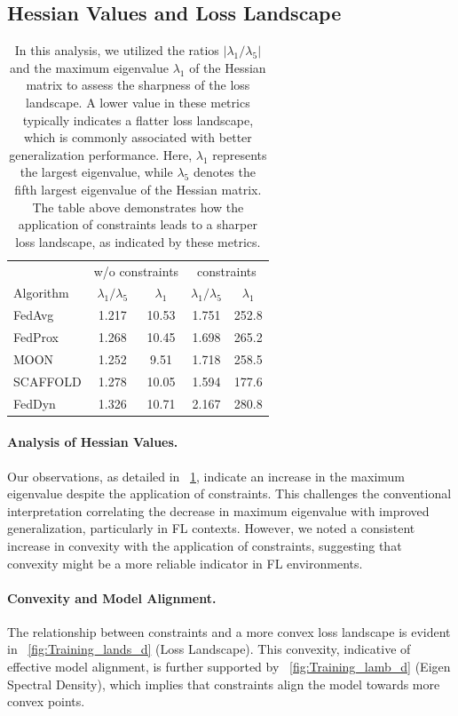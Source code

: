 \documentclass{article}
\theoremstyle{plain}
\theoremstyle{definition}
\theoremstyle{remark}
\begin{document}
\subsection{Hessian Values and Loss Landscape}


\begin{table}[!ht]
\centering
\begin{tabular}{l|cc|cc}
\hline
& \multicolumn{2}{c|}{w/o constraints} & \multicolumn{2}{c}{constraints} \\
Algorithm & $\lambda_{1}/ \lambda_{5}$ & $\lambda_{1}$ & $\lambda_{1}/ \lambda_{5}$ & $\lambda_{1}$ \\
\hline
FedAvg & 1.217 & 10.53 & 1.751 & 252.8 \\
FedProx & 1.268 & 10.45 & 1.698 & 265.2 \\
MOON & 1.252 & 9.51 & 1.718 & 258.5 \\
SCAFFOLD & 1.278 & 10.05 & 1.594 & 177.6 \\
FedDyn & 1.326 & 10.71 & 2.167 & 280.8 \\
\hline
\end{tabular}
\caption{In this analysis, we utilized the ratios $|\lambda_{1} / \lambda_{5}|$ and the maximum eigenvalue $\lambda_{1}$ of the Hessian matrix to assess the sharpness of the loss landscape. A lower value in these metrics typically indicates a flatter loss landscape, which is commonly associated with better generalization performance. Here, $\lambda_{1}$ represents the largest eigenvalue, while $\lambda_{5}$ denotes the fifth largest eigenvalue of the Hessian matrix. The table above demonstrates how the application of constraints leads to a sharper loss landscape, as indicated by these metrics.}
\label{tab:hes}
\end{table}

\paragraph{Analysis of Hessian Values.}
Our observations, as detailed in ~\cref{tab:hes}, indicate an increase in the maximum eigenvalue despite the application of constraints. This challenges the conventional interpretation correlating the decrease in maximum eigenvalue with improved generalization, particularly in FL contexts. However, we noted a consistent increase in convexity with the application of constraints, suggesting that convexity might be a more reliable indicator in FL environments.

\paragraph{Convexity and Model Alignment.}
The relationship between constraints and a more convex loss landscape is evident in ~\cref{fig:Training_lands_d} (Loss Landscape). This convexity, indicative of effective model alignment, is further supported by ~\cref{fig:Training_lamb_d} (Eigen Spectral Density), which implies that constraints align the model towards more convex points.
\end{document}
